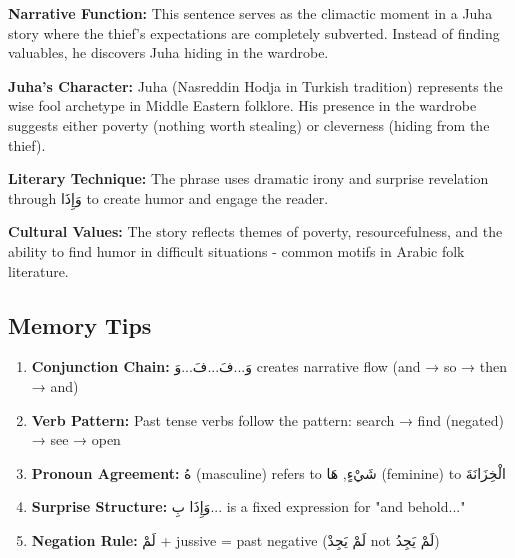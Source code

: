 \documentclass[letter,12pt]{article}
\begin{document}
\begin{tcolorbox}[colback=boxcolor,colframe=accentcolor,title=\textbf{Cultural and Literary Context},breakable]
\textbf{Narrative Function:} This sentence serves as the climactic moment in a Juha story where the thief's expectations are completely subverted. Instead of finding valuables, he discovers Juha hiding in the wardrobe.

\textbf{Juha's Character:} Juha (Nasreddin Hodja in Turkish tradition) represents the wise fool archetype in Middle Eastern folklore. His presence in the wardrobe suggests either poverty (nothing worth stealing) or cleverness (hiding from the thief).

\textbf{Literary Technique:} The phrase uses dramatic irony and surprise revelation through \textarabic{وَإِذَا} to create humor and engage the reader.

\textbf{Cultural Values:} The story reflects themes of poverty, resourcefulness, and the ability to find humor in difficult situations - common motifs in Arabic folk literature.
\end{tcolorbox}

\subsection{Memory Tips}
\begin{enumerate}
\item \textbf{Conjunction Chain:} \textarabic{وَ...فَ...فَ...وَ} creates narrative flow (and → so → then → and)
\item \textbf{Verb Pattern:} Past tense verbs follow the pattern: search → find (negated) → see → open
\item \textbf{Pronoun Agreement:} \textarabic{هُ} (masculine) refers to \textarabic{شَيْءٍ}, \textarabic{هَا} (feminine) to \textarabic{الْخِزَانَةَ}
\item \textbf{Surprise Structure:} \textarabic{وَإِذَا بِ...} is a fixed expression for "and behold..."
\item \textbf{Negation Rule:} \textarabic{لَمْ} + jussive = past negative (\textarabic{لَمْ يَجِدْ} not \textarabic{لَمْ يَجِدُ})
\end{enumerate}
\end{document}

